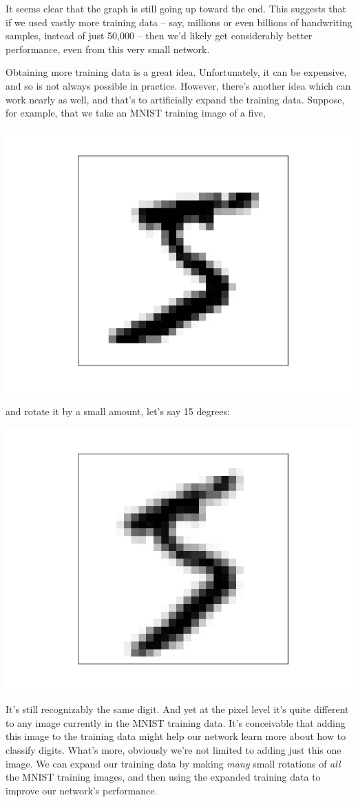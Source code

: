 \documentclass[a4paper,twoside,10pt]{book}
\begin{document}
It seems clear that the graph is still going up toward the end. This suggests that if we used vastly more training data -- say, millions or even billions of handwriting samples, instead of just 50,000 -- then we'd likely get considerably better performance, even from this very small network.

Obtaining more training data is a great idea. Unfortunately, it can be expensive, and so is not always possible in practice. However, there's another idea which can work nearly as well, and that's to artificially expand the training data. Suppose, for example, that we take an MNIST training image of a five,
\begin{center}
	\includegraphics[width=0.2\linewidth]{figures/ch3/more_data_5}
\end{center}
and rotate it by a small amount, let's say 15 degrees:
\begin{center}
	\includegraphics[width=0.2\linewidth]{figures/ch3/more_data_rotated_5}
\end{center}
It's still recognizably the same digit. And yet at the pixel level it's quite different to any image currently in the MNIST training data. It's conceivable that adding this image to the training data might help our network learn more about how to classify digits. What's more, obviously we're not limited to adding just this one image. We can expand our training data by making \textit{many} small rotations of \textit{all} the MNIST training images, and then using the expanded training data to improve our network's performance.
\end{document}
